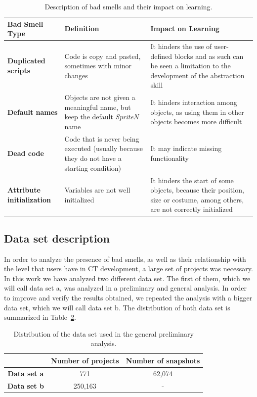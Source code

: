 \begin{table}
 \begin{center}
  \begin{tabular}{|p{4cm}|p{5cm}|p{5cm}|}
    \hline
    \textbf{Bad Smell Type} & \textbf{Definition} & \textbf{Impact on Learning} \\ \hline
    \textbf{Duplicated scripts} & Code is copy and pasted, sometimes with minor changes & It hinders the use of user-defined blocks and as such can be seen a limitation to the development of the abstraction skill \\ \hline
    \textbf{Default names} & Objects are not given a meaningful name, but keep the default {\em SpriteN} name & It hinders interaction among objects, as using them in other objects becomes more difficult \\ \hline
    \textbf{Dead code} & Code that is never being executed (usually because they do not have a starting condition) & It may indicate missing functionality \\ \hline
    \textbf{Attribute initialization} & Variables are not well initialized & It hinders the start of some objects, because their position, size or costume, among others, are not correctly initialized \\ \hline
  \end{tabular}
  \caption{Description of bad smells and their impact on learning.}
  \label{table:bad_smells}
 \end{center}
\end{table}

\subsection{Data set description}
\label{subsec:descrip_dataset}

In order to analyze the presence of bad smells, as well as their relationship with the level that users have in CT development, a large set of projects was necessary. In this work we have analyzed two different data set. The first of them, which we will call data set a, was analyzed in a preliminary and general analysis. In order to improve and verify the results obtained, we repeated the analysis with a bigger data set, which we will call data set b. The distribution of both data set is summarized in Table~\ref{table:dataset_distribution}.

\begin{table}
 \begin{center}
  \begin{tabular}{|c|c|c|}
    \hline
    & \textbf{Number of projects} & \textbf{Number of snapshots} \\ \hline
    \textbf{Data set a} & 771 & 62,074 \\ \hline
    \textbf{Data set b} & 250,163 & - \\ \hline
  \end{tabular}
  \caption{Distribution of the data set used in the general preliminary analysis.}
  \label{table:dataset_distribution}
 \end{center}
\end{table}



